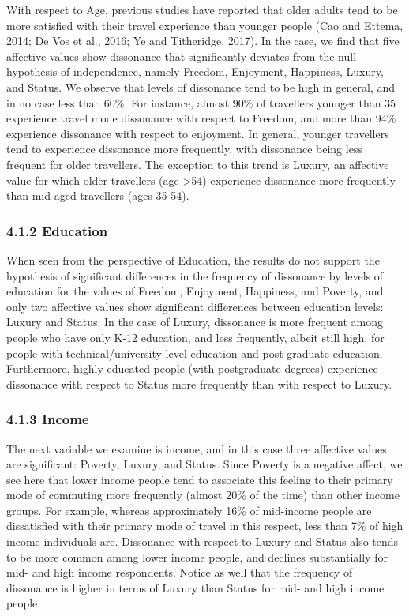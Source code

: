 \documentclass[]{elsarticle} %
\begin{document}
With respect to Age, previous studies have reported that older adults
tend to be more satisfied with their travel experience than younger
people (Cao and Ettema, 2014; De Vos et al., 2016; Ye and Titheridge,
2017). In the case, we find that five affective values show dissonance
that significantly deviates from the null hypothesis of independence,
namely Freedom, Enjoyment, Happiness, Luxury, and Status. We observe
that levels of dissonance tend to be high in general, and in no case
less than 60\%. For instance, almost 90\% of travellers younger than 35
experience travel mode dissonance with respect to Freedom, and more than
94\% experience dissonance with respect to enjoyment. In general,
younger travellers tend to experience dissonance more frequently, with
dissonance being less frequent for older travellers. The exception to
this trend is Luxury, an affective value for which older travellers (age
\textgreater{}54) experience dissonance more frequently than mid-aged
travellers (ages 35-54).

\hypertarget{education}{%
\subsubsection{4.1.2 Education}\label{education}}

When seen from the perspective of Education, the results do not support
the hypothesis of significant differences in the frequency of dissonance
by levels of education for the values of Freedom, Enjoyment, Happiness,
and Poverty, and only two affective values show significant differences
between education levels: Luxury and Status. In the case of Luxury,
dissonance is more frequent among people who have only K-12 education,
and less frequently, albeit still high, for people with
technical/university level education and post-graduate education.
Furthermore, highly educated people (with postgraduate degrees)
experience dissonance with respect to Status more frequently than with
respect to Luxury.

\hypertarget{income}{%
\subsubsection{4.1.3 Income}\label{income}}

The next variable we examine is income, and in this case three affective
values are significant: Poverty, Luxury, and Status. Since Poverty is a
negative affect, we see here that lower income people tend to associate
this feeling to their primary mode of commuting more frequently (almost
20\% of the time) than other income groups. For example, whereas
approximately 16\% of mid-income people are dissatisfied with their
primary mode of travel in this respect, less than 7\% of high income
individuals are. Dissonance with respect to Luxury and Status also tends
to be more common among lower income people, and declines substantially
for mid- and high income respondents. Notice as well that the frequency
of dissonance is higher in terms of Luxury than Status for mid- and high
income people.
\end{document}
